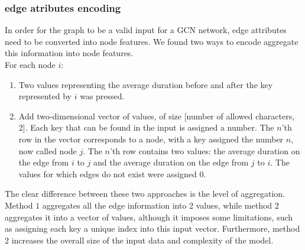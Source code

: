 \subsubsection{edge atributes encoding}
In order for the graph to be a valid input for a GCN network, edge attributes need to be converted into node features. We found two ways to encode aggregate this information into node features.\\  
For each node $i$:
\begin{enumerate}
	\item Two values representing the average duration before and after the key represented by $i$ was pressed.
	\item Add two-dimensional vector of values, of size [number of allowed characters, 2]. Each key that can be found in the input is assigned a number. The $n$'th row in the vector corresponds to a node, with a key assigned the number $n$, now called node $j$. The $n$'th row contains two values: the average duration on the edge from $i$ to $j$ and the average duration on the edge from $j$ to $i$. The values for which edges do not exist were assigned 0.
\end{enumerate}
The clear difference between these two approaches is the level of aggregation. Method $1$ aggregates all the edge information into 2 values, while method $2$ aggregates it into a vector of values, although it imposes some limitations, such as assigning each key a unique index into this input vector. Furthermore, method $2$ increases the overall size of the input data and complexity of the model.


